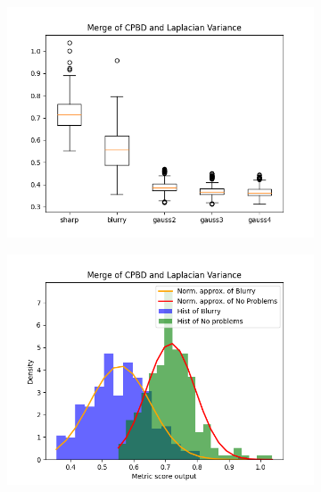 \begin{figure}[H]
    \centering
    \begin{subfigure}[t]{0.48\textwidth}
        \includegraphics[width=\textwidth]{Figures/cpbd_lv_alpha_4_jpg/output_boxplot_cpbd_lv.png}
        \caption{}
    \end{subfigure}\hspace{1em}
    \begin{subfigure}[t]{0.48\textwidth}
        \includegraphics[width=\textwidth]{Figures/cpbd_lv_alpha_4_jpg/output_dens_cpbd_lv.png}
        \caption{}
    \end{subfigure}\hspace{1em}
    \begin{subfigure}[t]{0.48\textwidth}

\end{subfigure}
\end{figure}
